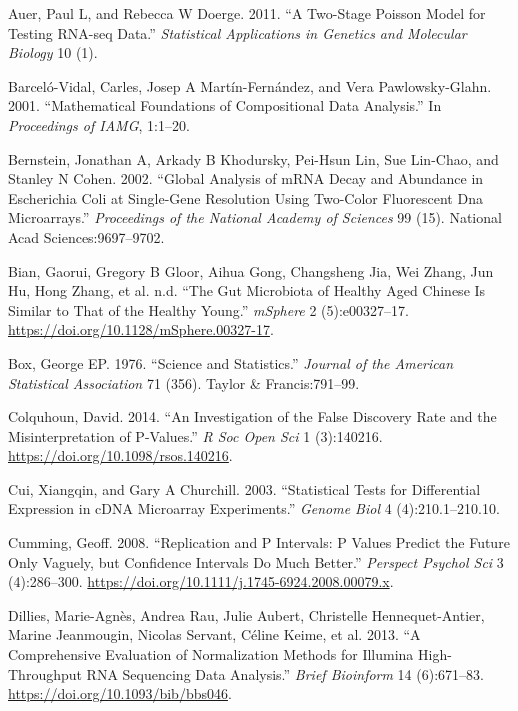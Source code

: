 \documentclass[onecolumn]{book}
\theoremstyle{definition}
\theoremstyle{definition}
\theoremstyle{definition}
\theoremstyle{remark}
\begin{document}
\leavevmode\hypertarget{ref-auer:2011}{}%
Auer, Paul L, and Rebecca W Doerge. 2011. ``A Two-Stage Poisson Model
for Testing RNA-seq Data.'' \emph{Statistical Applications in Genetics
and Molecular Biology} 10 (1).

\leavevmode\hypertarget{ref-barcelo:2001}{}%
Barceló-Vidal, Carles, Josep A Martín-Fernández, and Vera
Pawlowsky-Glahn. 2001. ``Mathematical Foundations of Compositional Data
Analysis.'' In \emph{Proceedings of IAMG}, 1:1--20.

\leavevmode\hypertarget{ref-mRNA:2002}{}%
Bernstein, Jonathan A, Arkady B Khodursky, Pei-Hsun Lin, Sue Lin-Chao,
and Stanley N Cohen. 2002. ``Global Analysis of mRNA Decay and Abundance
in Escherichia Coli at Single-Gene Resolution Using Two-Color
Fluorescent Dna Microarrays.'' \emph{Proceedings of the National Academy
of Sciences} 99 (15). National Acad Sciences:9697--9702.

\leavevmode\hypertarget{ref-bian:2017}{}%
Bian, Gaorui, Gregory B Gloor, Aihua Gong, Changsheng Jia, Wei Zhang,
Jun Hu, Hong Zhang, et al. n.d. ``The Gut Microbiota of Healthy Aged
Chinese Is Similar to That of the Healthy Young.'' \emph{mSphere} 2
(5):e00327--17. \url{https://doi.org/10.1128/mSphere.00327-17}.

\leavevmode\hypertarget{ref-box:1976}{}%
Box, George EP. 1976. ``Science and Statistics.'' \emph{Journal of the
American Statistical Association} 71 (356). Taylor \& Francis:791--99.

\leavevmode\hypertarget{ref-Colquhoun:2014aa}{}%
Colquhoun, David. 2014. ``An Investigation of the False Discovery Rate
and the Misinterpretation of P-Values.'' \emph{R Soc Open Sci} 1
(3):140216. \url{https://doi.org/10.1098/rsos.140216}.

\leavevmode\hypertarget{ref-Cui:2003aa}{}%
Cui, Xiangqin, and Gary A Churchill. 2003. ``Statistical Tests for
Differential Expression in cDNA Microarray Experiments.'' \emph{Genome
Biol} 4 (4):210.1--210.10.

\leavevmode\hypertarget{ref-Cumming:2008aa}{}%
Cumming, Geoff. 2008. ``Replication and P Intervals: P Values Predict
the Future Only Vaguely, but Confidence Intervals Do Much Better.''
\emph{Perspect Psychol Sci} 3 (4):286--300.
\url{https://doi.org/10.1111/j.1745-6924.2008.00079.x}.

\leavevmode\hypertarget{ref-Dillies:2013}{}%
Dillies, Marie-Agnès, Andrea Rau, Julie Aubert, Christelle
Hennequet-Antier, Marine Jeanmougin, Nicolas Servant, Céline Keime, et
al. 2013. ``A Comprehensive Evaluation of Normalization Methods for
Illumina High-Throughput RNA Sequencing Data Analysis.'' \emph{Brief
Bioinform} 14 (6):671--83. \url{https://doi.org/10.1093/bib/bbs046}.
\end{document}
